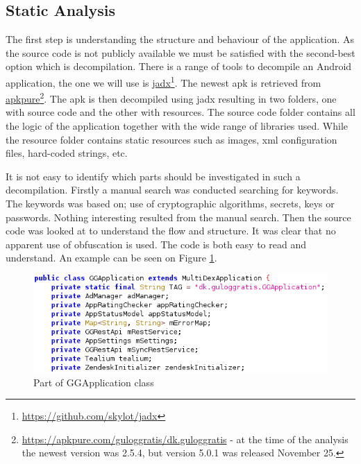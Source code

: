 \subsection{Static Analysis}
The first step is understanding the structure and behaviour of the application. As the source code is not publicly available we must be satisfied with the second-best option which is decompilation. There is a range of tools to decompile an Android application, the one we will use is \href{https://github.com/skylot/jadx}{jadx}\footnote{\href{https://github.com/skylot/jadx}{https://github.com/skylot/jadx}}. The newest apk is retrieved from \href{https://apkpure.com/guloggratis/dk.guloggratis}{apkpure}\footnote{\href{https://apkpure.com/guloggratis/dk.guloggratis}{https://apkpure.com/guloggratis/dk.guloggratis} - at the time of the analysis the newest version was 2.5.4, but version 5.0.1 was released November 25. }. The apk is then decompiled using jadx resulting in two folders, one with source code and the other with resources. The source code folder contains all the logic of the application together with the wide range of libraries used. While the resource folder contains static resources such as images, xml configuration files, hard-coded strings, etc.

It is not easy to identify which parts should be investigated in such a decompilation. Firstly a manual search was conducted searching for keywords. The keywords was based on; use of cryptographic algorithms, secrets, keys or passwords. Nothing interesting resulted from the manual search. Then the source code  was looked at to understand the flow and structure. It was clear that no apparent use of obfuscation is used. The code is both easy to read and understand. An example can be seen on Figure \ref{fig:ggapplication-properties}. 

\begin{figure}[htbp]
    \centering
    \includegraphics[width=1\columnwidth]{../static-analysis/pictures/GGApplication_properties.png}
    \caption{Part of GGApplication class}
    \label{fig:ggapplication-properties}
\end{figure}

